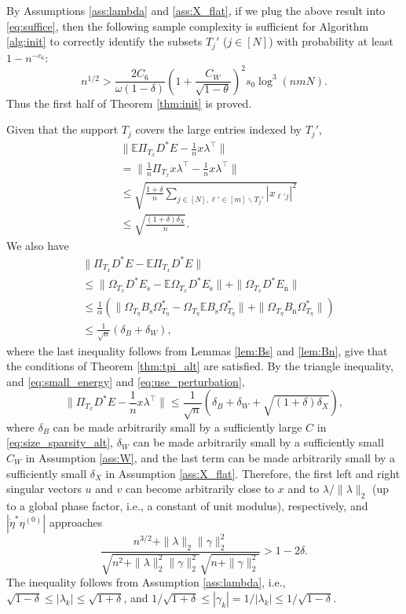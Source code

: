 \documentclass[11pt,journal]{IEEEtran}
\newcommand{\bbE}{\mathbb{E}}
\newcommand{\rms}{\mathrm{s}}
\newcommand{\rmn}{\mathrm{n}}
\newcommand{\norm}[1]{\|{#1}\|}
\newcommand{\T}{\top}
\begin{document}
\begin{IEEEproof}
By Assumptions \ref{ass:lambda} and \ref{ass:X_flat}, if we plug the above result into \eqref{eq:suffice}, then the following sample complexity is sufficient for Algorithm \ref{alg:init} to correctly identify the subsets $T_j'$ ($j\in[N]$) with probability at least $1-n^{-c_6}$:
\[
n^{1/2} > \frac{2C_6}{\omega(1-\delta)} \left(1+\frac{C_W}{\sqrt{1-\theta}}\right)^2 s_0\log^3 (nmN).
\]
Thus the first half of Theorem \ref{thm:init} is proved.

Given that the support $T_j$ covers the large entries indexed by $T_j'$,
\begin{align}
& \norm{\bbE \Pi_{T_x} D^* E - \frac{1}{n} x \lambda^\T}  \nonumber\\
& = \norm{\frac{1}{n}\Pi_{T_x} x \lambda^\T - \frac{1}{n} x \lambda^\T}  \nonumber\\
& \leq \sqrt{\frac{1+\delta}{n} \sum_{j\in [N],\ell'\in[m]\backslash T_j'} |x_{\ell' j}|^2} \nonumber\\
& \leq \sqrt{\frac{(1+\delta)\delta_X}{n}}. \label{eq:small_energy}
\end{align}
We also have
\begin{align}
& \norm{ \Pi_{T_x} D^* E - \bbE \Pi_{T_x} D^* E } \nonumber\\
& \leq \norm{ \Omega_{T_x} D^* E_\rms - \bbE \Omega_{T_x} D^* E_\rms } + \norm{ \Omega_{T_x} D^* E_\rmn } \nonumber\\
& \leq \frac{1}{\alpha} (\norm{ \Omega_{T_\eta} B_\rms \Omega_{T_\eta}^* - \Omega_{T_\eta} \bbE B_\rms \Omega_{T_\eta}^*} + \norm{ \Omega_{T_\eta} B_\rmn \Omega_{T_\eta}^* } ) \nonumber\\
& \leq \frac{1}{\sqrt{n}} (\delta_B + \delta_W), \label{eq:use_perturbation}
\end{align}
where the last inequality follows from Lemmas \ref{lem:Bs} and \ref{lem:Bn}, give that the conditions of Theorem \ref{thm:tpi_alt} are satisfied. By the triangle inequality, and \eqref{eq:small_energy} and \eqref{eq:use_perturbation},
\[
\norm{ \Pi_{T_x} D^* E - \frac{1}{n} x \lambda^\T } \leq \frac{1}{\sqrt{n}} (\delta_B + \delta_W + \sqrt{(1+\delta)\delta_X}),
\]
where $\delta_B$ can be made arbitrarily small by a sufficiently large $C$ in \eqref{eq:size_sparsity_alt}, $\delta_W$ can be made arbitrarily small by a sufficiently small $C_W$ in Assumption \ref{ass:W}, and the last term can be made arbitrarily small by a sufficiently small $\delta_X$ in Assumption \ref{ass:X_flat}. Therefore, the first left and right singular vectors $u$ and $v$ can become arbitrarily close to $x$ and to $\lambda/\norm{\lambda}_2$ (up to a global phase factor, i.e., a constant of unit modulus), respectively, and $|\dot{\eta}^* \eta^{(0)}|$ approaches
\[
\frac{n^{3/2}+\norm{\lambda}_2\norm{\gamma}_2^2}{\sqrt{n^2+\norm{\lambda}_2^2\norm{\gamma}_2^2}\sqrt{n+\norm{\gamma}_2^2}} > 1-2\delta.
\]
The inequality follows from Assumption \ref{ass:lambda}, i.e., $\sqrt{1-\delta} \leq |\lambda_k| \leq \sqrt{1+\delta}$, and $1/\sqrt{1+\delta} \leq |\gamma_k| = 1 / |\lambda_k| \leq 1/\sqrt{1-\delta}$.
\end{IEEEproof}
\end{document}
